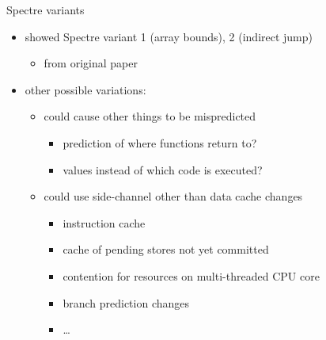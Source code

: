\begin{frame}{Spectre variants}
    \begin{itemize}
    \item showed Spectre variant 1 (array bounds), 2 (indirect jump)
        \begin{itemize}
        \item from original paper
        \end{itemize}
    \vspace{.5cm}
    \item other possible variations:
        \begin{itemize}
        \item could cause other things to be mispredicted
            \begin{itemize}
            \item prediction of where functions return to?
            \item values instead of which code is executed?
            \end{itemize}
        \item could use side-channel other than data cache changes
            \begin{itemize}
            \item instruction cache
            \item cache of pending stores not yet committed
            \item contention for resources on multi-threaded CPU core
            \item branch prediction changes
            \item \ldots
            \end{itemize}
        \end{itemize}
    \end{itemize}
\end{frame}
